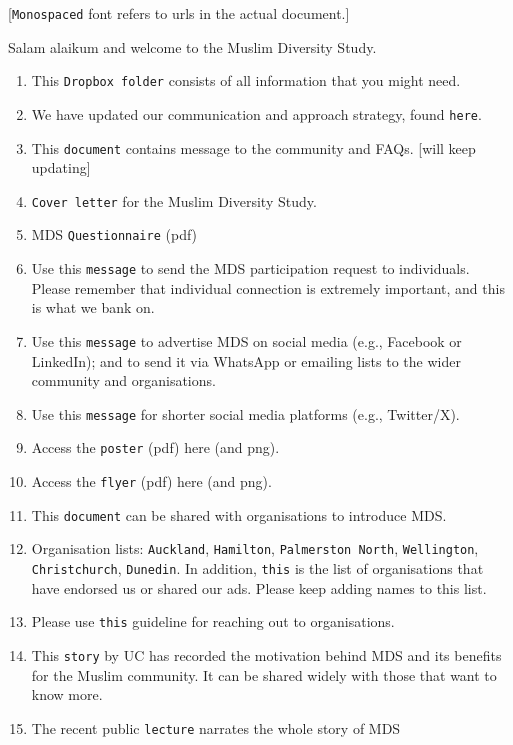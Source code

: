 \documentclass[
]{interact}
\providecommand{\tightlist}{%
  \setlength{\itemsep}{0pt}\setlength{\parskip}{0pt}}\usepackage{longtable,booktabs,array}
\begin{document}
{[}\texttt{Monospaced} font refers to urls in the actual document.{]}

\noindent Salam alaikum and welcome to the Muslim Diversity Study.

\begin{enumerate}
\def\labelenumi{\arabic{enumi}.}
\tightlist
\item
  This \texttt{Dropbox\ folder} consists of all information that you
  might need.
\item
  We have updated our communication and approach strategy, found
  \texttt{here}.
\item
  This \texttt{document} contains message to the community and FAQs.
  {[}will keep updating{]}
\item
  \texttt{Cover\ letter} for the Muslim Diversity Study.
\item
  MDS \texttt{Questionnaire} (pdf)
\item
  Use this \texttt{message} to send the MDS participation request to
  individuals. Please remember that individual connection is extremely
  important, and this is what we bank on.
\item
  Use this \texttt{message} to advertise MDS on social media (e.g.,
  Facebook or LinkedIn); and to send it via WhatsApp or emailing lists
  to the wider community and organisations.
\item
  Use this \texttt{message} for shorter social media platforms (e.g.,
  Twitter/X).
\item
  Access the \texttt{poster} (pdf) here (and png).
\item
  Access the \texttt{flyer} (pdf) here (and png).
\item
  This \texttt{document} can be shared with organisations to introduce
  MDS.
\item
  Organisation lists: \texttt{Auckland}, \texttt{Hamilton},
  \texttt{Palmerston\ North}, \texttt{Wellington},
  \texttt{Christchurch}, \texttt{Dunedin}. In addition, \texttt{this} is
  the list of organisations that have endorsed us or shared our ads.
  Please keep adding names to this list.
\item
  Please use \texttt{this} guideline for reaching out to organisations.
\item
  This \texttt{story} by UC has recorded the motivation behind MDS and
  its benefits for the Muslim community. It can be shared widely with
  those that want to know more.
\item
  The recent public \texttt{lecture} narrates the whole story of MDS

\end{enumerate}
\end{document}
